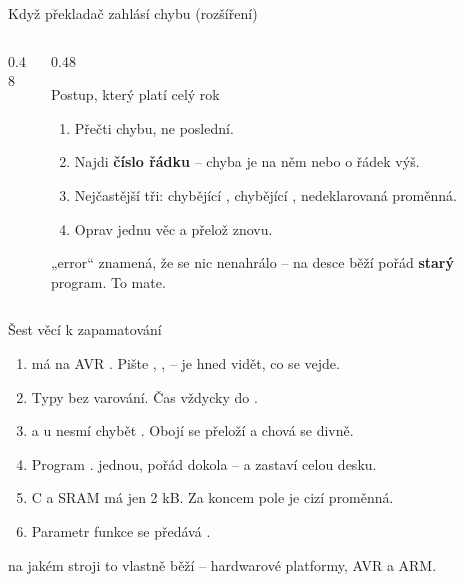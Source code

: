 \documentclass[12pt,aspectratio=169]{beamer}
\newcommand{\roz}{ {\normalfont\footnotesize\textcolor{SPSGrey}{(rozšíření)}}}
\begin{document}
\begin{frame}{Když překladač zahlásí chybu\roz}
  \begin{columns}[T]
    \begin{column}{0.48\textwidth}
    \end{column}
    \begin{column}{0.48\textwidth}
      \begin{block}{Postup, který platí celý rok}
        \footnotesize
        \begin{enumerate}\itemsep1pt
          \item Přečti  chybu, ne poslední.
          \item Najdi \textbf{číslo řádku} -- chyba je na něm nebo o řádek výš.
          \item Nejčastější tři: chybějící \kod{;}, chybějící \kod{\}},
                nedeklarovaná proměnná.
          \item Oprav jednu věc a přelož znovu.
        \end{enumerate}
      \end{block}
      \footnotesize
       „error`` znamená, že se nic nenahrálo -- na desce běží pořád
      \textbf{starý} program. To mate.
    \end{column}
  \end{columns}
\end{frame}

\begin{keyframe}{Šest věcí k zapamatování}
  \footnotesize
  \begin{enumerate}\itemsep1pt
    \item {} má na AVR . Pište , ,
           -- je hned vidět, co se vejde.
    \item Typy   bez varování. Čas vždycky
          do .
    \item {} a u  nesmí chybět .
          Obojí se přeloží a chová se divně.
    \item Program .  jednou,  pořád
          dokola -- a  zastaví celou desku.
    \item C  a SRAM má jen 2 kB. Za koncem pole
          je cizí proměnná.
    \item Parametr funkce se předává .
  \end{enumerate}
  \vfill
   na jakém stroji to vlastně běží -- hardwarové platformy,
  AVR a ARM.
\end{keyframe}
\end{document}
